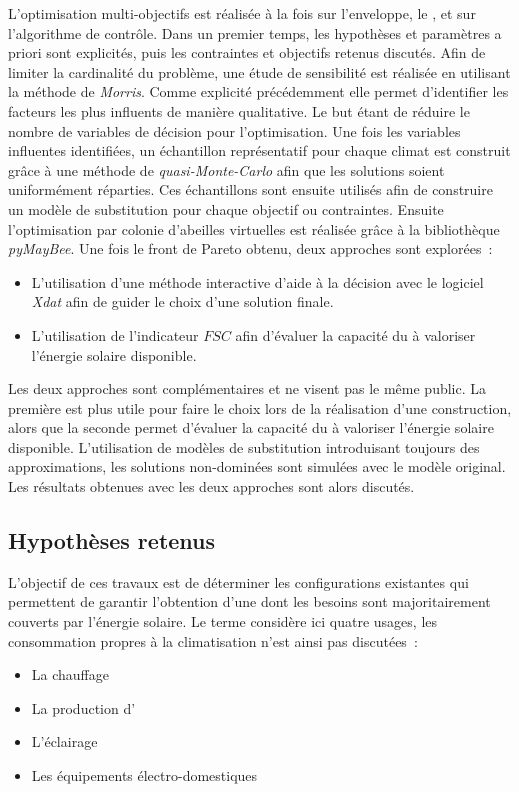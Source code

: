 L’optimisation multi-objectifs est réalisée à la fois sur l’enveloppe, le ,
et sur l’algorithme de contrôle. Dans un premier temps, les hypothèses
et paramètres a priori sont explicités, puis les contraintes et objectifs retenus
discutés. Afin de limiter la
cardinalité du problème, une étude de sensibilité est réalisée en utilisant la méthode de
\textit{Morris}. Comme explicité précédemment elle permet d’identifier les facteurs les
plus influents de manière qualitative. Le but étant de réduire le nombre de variables de
décision pour l’optimisation. Une fois les variables influentes
identifiées, un échantillon représentatif pour chaque climat est construit grâce à une
méthode de \textit{quasi-Monte-Carlo} afin que les solutions soient uniformément réparties.
Ces échantillons sont ensuite utilisés afin de construire un modèle de substitution pour chaque objectif ou
contraintes. Ensuite l’optimisation par colonie d’abeilles virtuelles est réalisée
grâce à la bibliothèque \textit{pyMayBee}.
Une fois le front de Pareto obtenu, deux approches sont explorées~:
\begin{itemize}
  \item L’utilisation d’une méthode interactive d’aide à la décision avec le
        logiciel \textit{Xdat} afin de guider le choix d’une solution finale.
  \item L’utilisation de l’indicateur $FSC$ afin d’évaluer la capacité du 
        à valoriser l’énergie solaire disponible.
\end{itemize}
Les deux approches sont complémentaires et ne visent pas le même public. La première
est plus utile pour faire le choix lors de la réalisation d’une construction, alors que
la seconde permet d’évaluer la capacité du  à valoriser l’énergie solaire
disponible.
L’utilisation de modèles de substitution introduisant toujours des approximations,
les solutions non-dominées sont simulées avec le modèle original. Les résultats obtenues
avec les deux approches sont alors discutés.



\subsection{Hypothèses retenus} %
\label{sub:hypotheses_retenus}
L’objectif de ces travaux est de déterminer les configurations existantes qui permettent
de garantir l’obtention d’une  dont les besoins sont majoritairement couverts
par l’énergie solaire. Le terme  considère ici quatre usages, les consommation
propres à la climatisation n’est ainsi pas discutées~:
\begin{itemize}
  \item La chauffage
  \item La production d’
  \item L’éclairage
  \item Les équipements électro-domestiques
\end{itemize}



